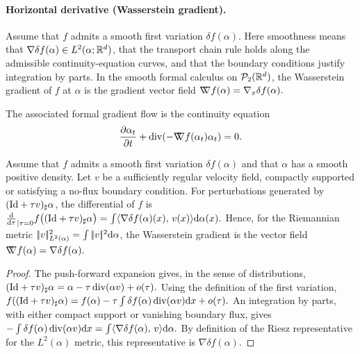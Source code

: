 \paragraph{Horizontal derivative (Wasserstein gradient).}
\begin{defn}\label{def-wasserstein-gradient}
Assume that $f$ admits a smooth first variation $\delta f(\alpha)$. Here smoothness means that $\nabla\delta f(\alpha)\in L^2(\alpha;\mathbb{R}^d)$, that the transport chain rule holds along the admissible continuity-equation curves, and that the boundary conditions justify integration by parts. In the smooth formal calculus on $\mathcal{P}_2(\mathbb{R}^d)$, the Wasserstein gradient of $f$ at $\alpha$ is the gradient vector field
\(\mathord{\nabla\mkern-9.3mu\nabla} f(\alpha) = \nabla_x \delta f(\alpha).\)
\end{defn}
The associated formal gradient flow is the continuity equation
\begin{equation}
\frac{\partial \alpha_t}{\partial t} + \operatorname{div}(-\mathord{\nabla\mkern-9.3mu\nabla} f(\alpha_t) \alpha_t) = 0. \label{eq:wassflow-pde}
\end{equation}
\begin{proposition}\label{prop-formal-wass-gradient}
Assume that $f$ admits a smooth first variation $\delta f(\alpha)$ and that $\alpha$ has a smooth positive density. Let $v$ be a sufficiently regular velocity field, compactly supported or satisfying a no-flux boundary condition. For perturbations generated by $(\mathrm{Id}+\tau v)_\sharp\alpha$, the differential of $f$ is
\(\frac{\mathrm{d}}{\mathrm{d}\tau}_{|\tau=0} f\big((\mathrm{Id}+\tau v)_\sharp\alpha\big) = \int \langle \nabla \delta f(\alpha)(x),\,v(x)\rangle\mathrm{d}\alpha(x).\)
Hence, for the Riemannian metric $|\!| v |\!|_{L^2(\alpha)}^2=\int |\!| v |\!|^2\mathrm{d}\alpha$, the Wasserstein gradient is the vector field
\(\mathord{\nabla\mkern-9.3mu\nabla} f(\alpha)=\nabla \delta f(\alpha).\)
\end{proposition}
\begin{proof}
The push-forward expansion gives, in the sense of distributions, \((\mathrm{Id}+\tau v)_\sharp\alpha = \alpha-\tau\operatorname{div}(\alpha v)+o(\tau).\)
Using the definition of the first variation, \(f((\mathrm{Id}+\tau v)_\sharp\alpha) = f(\alpha)-\tau\int \delta f(\alpha)\operatorname{div}(\alpha v)\mathrm{d} x+o(\tau).\)
An integration by parts, with either compact support or vanishing boundary flux, gives \(-\int \delta f(\alpha)\operatorname{div}(\alpha v)\mathrm{d} x = \int \langle \nabla\delta f(\alpha),\,v\rangle\mathrm{d}\alpha.\)
By definition of the Riesz representative for the $L^2(\alpha)$ metric, this representative is $\nabla\delta f(\alpha)$.
\end{proof}
